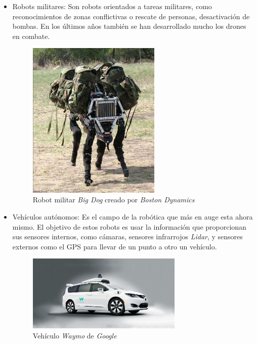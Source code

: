 \begin{itemize}
    \item Robots militares: Son robots orientados a tareas militares, como reconocimientos de zonas conflictivas o rescate de personas, desactivación de bombas. En los últimos años también se han desarrollado mucho los drones en combate.
      \begin{figure}[H]
    \centering
    \includegraphics[width=0.6\textwidth]{img/bigdog.jpg}
    \caption{Robot militar \textit{Big Dog} creado por \textit{Boston Dynamics}} \label{fig:bigdog}
    \end{figure}
    
    \item Vehículos autónomos: Es el campo de la robótica que más en auge esta ahora mismo. El objetivo de estos robots es usar la información que proporcionan sus sensores internos, como cámaras, sensores infrarrojos \textit{Lidar}, y sensores externos como el GPS para llevar de un punto a otro un vehículo.

    \begin{figure}[H]
        \centering
        \includegraphics[width=0.7\textwidth]{img/waymo.jpg}
        \caption{Vehículo \textit{Waymo} de \textit{Google}} \label{fig:waymo}
    \end{figure}


\end{itemize}
